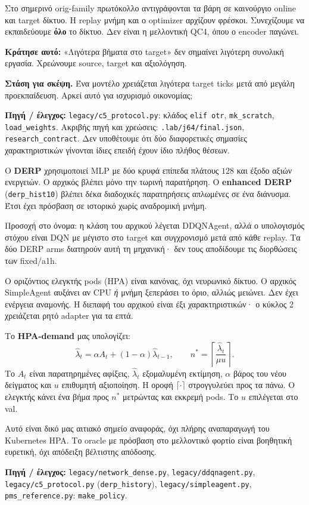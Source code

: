 \documentclass[11pt,a4paper]{article}
\newcommand{\page}[2]{\clearpage\pdfbookmark[0]{#1}{topic\thepage}{\sffamily\color{ink}\LARGE #1\par}\vspace{3pt}{\sffamily\large #2\par}\vspace{8pt}}
\newcommand{\idea}[1]{\par\noindent\colorbox{soft}{\parbox{\dimexpr\linewidth-2\fboxsep}{\textbf{Κράτησε αυτό:} #1}}\par}
\newcommand{\think}[1]{\par\textbf{Στάση για σκέψη.} #1}
\newcommand{\src}[1]{\vfill{\footnotesize\color{ink}\textbf{Πηγή / έλεγχος:} #1\par}}
\newcommand{\code}[1]{{\footnotesize\nolinkurl{#1}}}
\begin{document}
Στο σημερινό orig-family πρωτόκολλο αντιγράφονται τα βάρη σε καινούργιο online και target δίκτυο. Η replay μνήμη και ο optimizer αρχίζουν φρέσκοι. Συνεχίζουμε να εκπαιδεύουμε \textbf{όλο} το δίκτυο. Δεν είναι η μελλοντική QC4, όπου ο encoder παγώνει.

\idea{«Λιγότερα βήματα στο target» δεν σημαίνει λιγότερη συνολική εργασία. Χρεώνουμε source, target και αξιολόγηση.}
\think{Ένα μοντέλο χρειάζεται λιγότερα target ticks μετά από μεγάλη προεκπαίδευση. Αρκεί αυτό για ισχυρισμό οικονομίας;}
\src{\code{legacy/c5_protocol.py}: κλάδος \code{elif otr}, \code{mk_scratch}, \code{load_weights}. Ακριβής πηγή και χρεώσεις: \code{.lab/j64/final.json}, \code{research_contract}. Δεν υποθέτουμε ότι δύο διαφορετικές σημασίες χαρακτηριστικών γίνονται ίδιες επειδή έχουν ίδιο πλήθος θέσεων.}

\page{10 · DERP και HPA}{Άλλες αρχιτεκτονικές, άλλοι κανόνες}
Ο \textbf{DERP} χρησιμοποιεί MLP με δύο κρυφά επίπεδα πλάτους $128$ και έξοδο αξιών ενεργειών. Ο αρχικός βλέπει μόνο την τωρινή παρατήρηση. Ο \textbf{enhanced DERP} (\code{derp_hist10}) βλέπει δέκα διαδοχικές παρατηρήσεις απλωμένες σε ένα διάνυσμα. Έτσι έχει πρόσβαση σε ιστορικό χωρίς αναδρομική μνήμη.

Προσοχή στο όνομα: η κλάση του αρχικού λέγεται DDQNAgent, αλλά ο υπολογισμός στόχου είναι DQN με μέγιστο στο target και συγχρονισμό μετά από κάθε replay. Τα δύο DERP arms διατηρούν αυτή τη μηχανική· δεν τους αποδίδουμε τις διορθώσεις των fixed/a1h.

Ο οριζόντιος ελεγκτής pods (HPA) είναι κανόνας, όχι νευρωνικό δίκτυο. Ο αρχικός SimpleAgent αυξάνει αν CPU \emph{ή} μνήμη ξεπεράσει το όριο, αλλιώς μειώνει. Δεν έχει ενέργεια αναμονής. Η διεπαφή του αρχικού είναι έξι χαρακτηριστικών· ο κύκλος 2 χρειάζεται ρητό adapter για τα επτά.

Το \textbf{HPA-demand} μας υπολογίζει:
\[
 \widehat\lambda_t=\alpha A_t+(1-\alpha)\widehat\lambda_{t-1},\qquad
 n^*=\left\lceil\frac{\widehat\lambda_t}{\mu u}\right\rceil.
\]
Το $A_t$ είναι παρατηρημένες αφίξεις, $\widehat\lambda_t$ εξομαλυμένη εκτίμηση, $\alpha$ βάρος του νέου δείγματος και $u$ επιθυμητή αξιοποίηση. Η οροφή $\lceil\cdot\rceil$ στρογγυλεύει προς τα πάνω. Ο ελεγκτής κάνει ένα βήμα προς $n^*$ μετρώντας και εκκρεμή pods. Το $u$ επιλέγεται στο val.

Αυτό είναι δικό μας αιτιακό σημείο αναφοράς, όχι πλήρης αναπαραγωγή του Kubernetes HPA. Το oracle με πρόσβαση στο μελλοντικό φορτίο είναι βοηθητική ευρετική, όχι απόδειξη βέλτιστης απόδοσης.
\src{\code{legacy/network_dense.py}, \code{legacy/ddqnagent.py}, \code{legacy/c5_protocol.py} (\code{derp_history}), \code{legacy/simpleagent.py}, \code{pms_reference.py}: \code{make_policy}.}
\end{document}
